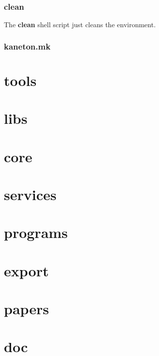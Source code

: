 \documentclass[8pt]{beamer}
\begin{document}

\begin{frame}
  \frametitle{clean}

  The \textbf{clean} shell script just cleans the environment.
\end{frame}


\begin{frame}
  \frametitle{kaneton.mk}

\end{frame}

%
%

\section{tools}

%
%

\section{libs}

%
%

\section{core}

%
%

\section{services}

%
%

\section{programs}

%
%

\section{export}

%
%

\section{papers}

%
%

\section{doc}
\end{document}
